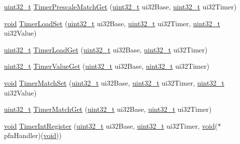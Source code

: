 \begin{DoxyCompactItemize}
\item 
\hyperlink{_p_e___types_8h_a33594304e786b158f3fb30289278f5af}{uint32\+\_\+t} \hyperlink{group__timer__api_ga308ed5bb13bf4084ffa99a4088e95607}{Timer\+Prescale\+Match\+Get} (\hyperlink{_p_e___types_8h_a33594304e786b158f3fb30289278f5af}{uint32\+\_\+t} ui32\+Base, \hyperlink{_p_e___types_8h_a33594304e786b158f3fb30289278f5af}{uint32\+\_\+t} ui32\+Timer)
\item 
\hyperlink{usb__devapi_8h_afabf60e7f57651d6d595a02c75f07cd0}{void} \hyperlink{group__timer__api_ga20a168e18a8d3502809ad53c031e4613}{Timer\+Load\+Set} (\hyperlink{_p_e___types_8h_a33594304e786b158f3fb30289278f5af}{uint32\+\_\+t} ui32\+Base, \hyperlink{_p_e___types_8h_a33594304e786b158f3fb30289278f5af}{uint32\+\_\+t} ui32\+Timer, \hyperlink{_p_e___types_8h_a33594304e786b158f3fb30289278f5af}{uint32\+\_\+t} ui32\+Value)
\item 
\hyperlink{_p_e___types_8h_a33594304e786b158f3fb30289278f5af}{uint32\+\_\+t} \hyperlink{group__timer__api_ga6f98f47c976fcc5aa4940f4cd13bca9b}{Timer\+Load\+Get} (\hyperlink{_p_e___types_8h_a33594304e786b158f3fb30289278f5af}{uint32\+\_\+t} ui32\+Base, \hyperlink{_p_e___types_8h_a33594304e786b158f3fb30289278f5af}{uint32\+\_\+t} ui32\+Timer)
\item 
\hyperlink{_p_e___types_8h_a33594304e786b158f3fb30289278f5af}{uint32\+\_\+t} \hyperlink{group__timer__api_gae2e97500dde91c8c2818d67579928bdd}{Timer\+Value\+Get} (\hyperlink{_p_e___types_8h_a33594304e786b158f3fb30289278f5af}{uint32\+\_\+t} ui32\+Base, \hyperlink{_p_e___types_8h_a33594304e786b158f3fb30289278f5af}{uint32\+\_\+t} ui32\+Timer)
\item 
\hyperlink{usb__devapi_8h_afabf60e7f57651d6d595a02c75f07cd0}{void} \hyperlink{group__timer__api_ga9861af3764dc7247aa279fa11ebbf2b3}{Timer\+Match\+Set} (\hyperlink{_p_e___types_8h_a33594304e786b158f3fb30289278f5af}{uint32\+\_\+t} ui32\+Base, \hyperlink{_p_e___types_8h_a33594304e786b158f3fb30289278f5af}{uint32\+\_\+t} ui32\+Timer, \hyperlink{_p_e___types_8h_a33594304e786b158f3fb30289278f5af}{uint32\+\_\+t} ui32\+Value)
\item 
\hyperlink{_p_e___types_8h_a33594304e786b158f3fb30289278f5af}{uint32\+\_\+t} \hyperlink{group__timer__api_gab1fb1ab94aa50aebee303767db637129}{Timer\+Match\+Get} (\hyperlink{_p_e___types_8h_a33594304e786b158f3fb30289278f5af}{uint32\+\_\+t} ui32\+Base, \hyperlink{_p_e___types_8h_a33594304e786b158f3fb30289278f5af}{uint32\+\_\+t} ui32\+Timer)
\item 
\hyperlink{usb__devapi_8h_afabf60e7f57651d6d595a02c75f07cd0}{void} \hyperlink{group__timer__api_ga7802775703f5b161bd39e8ef3858ce8d}{Timer\+Int\+Register} (\hyperlink{_p_e___types_8h_a33594304e786b158f3fb30289278f5af}{uint32\+\_\+t} ui32\+Base, \hyperlink{_p_e___types_8h_a33594304e786b158f3fb30289278f5af}{uint32\+\_\+t} ui32\+Timer, \hyperlink{usb__devapi_8h_afabf60e7f57651d6d595a02c75f07cd0}{void}($\ast$pfn\+Handler)(\hyperlink{usb__devapi_8h_afabf60e7f57651d6d595a02c75f07cd0}{void}))

\end{DoxyCompactItemize}
